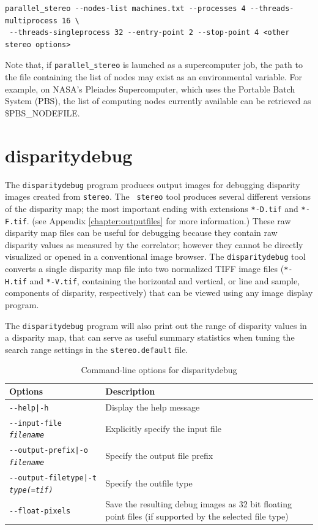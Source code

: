 \begin{verbatim}
parallel_stereo --nodes-list machines.txt --processes 4 --threads-multiprocess 16 \
 --threads-singleprocess 32 --entry-point 2 --stop-point 4 <other stereo options>
\end{verbatim}

Note that, if \texttt{parallel\_stereo} is launched as a supercomputer
job, the path to the file containing the list of nodes may exist as an environmental
variable. For example, on NASA's Pleiades Supercomputer, which uses the
Portable Batch System (PBS), the list of computing nodes currently
available can be retrieved as \$PBS\_NODEFILE.

\section{disparitydebug}
\label{disparitydebug}

The \texttt{disparitydebug} program produces output images for
debugging disparity images created from \verb#stereo#. The {\tt
stereo} tool produces several different versions of the disparity
map; the most important ending with extensions \verb#*-D.tif# and
\verb#*-F.tif#. (see Appendix \ref{chapter:outputfiles} for more
information.)  These raw disparity map files can be useful for
debugging because they contain raw disparity values as measured by
the correlator; however they cannot be directly visualized or opened
in a conventional image browser.  The \verb#disparitydebug# tool
converts a single disparity map file into two normalized TIFF image
files (\verb#*-H.tif# and \verb#*-V.tif#, containing the horizontal
and vertical, or line and sample, components of disparity, respectively)
that can be viewed using any image display program.

The {\tt disparitydebug} program will also print out the range of
disparity values in a disparity map, that can serve as useful summary
statistics when tuning the search range settings in the
{\tt stereo.default} file.

\begin{longtable}{|l|p{10cm}|}
\caption{Command-line options for disparitydebug}
\label{tbl:disparitydebug}
\endfirsthead
\endhead
\endfoot
\endlastfoot
\hline
Options & Description \\ \hline \hline
\texttt{-\/-help|-h} & Display the help message\\ \hline
\texttt{-\/-input-file \textit{filename}} & Explicitly specify the input file \\ \hline
\texttt{-\/-output-prefix|-o \textit{filename}} & Specify the output file prefix \\ \hline
\texttt{-\/-output-filetype|-t \textit{type(=tif)}} & Specify the outfile type \\ \hline
\texttt{-\/-float-pixels} & Save the resulting debug images as 32 bit floating point files (if supported by the selected file type) \\ \hline
\end{longtable}

